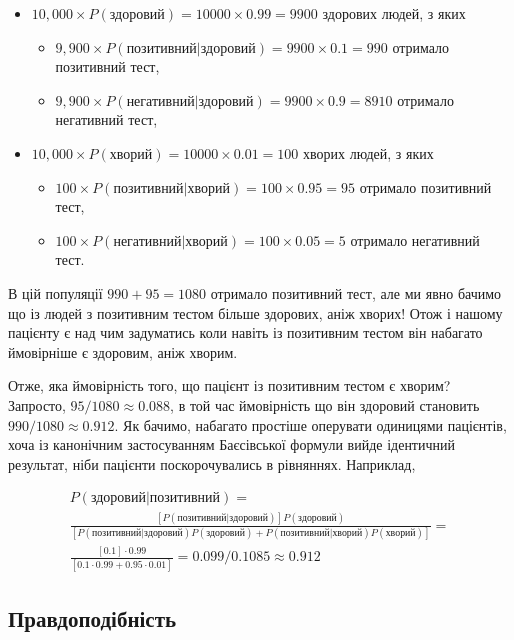 \documentclass[
  11pt,
]{book}
\begin{document}
\begin{itemize}
\item
  \(10,000 \times P(\text{здоровий}) = 10000 \times 0.99 = 9900\) здорових людей, з яких

  \begin{itemize}
  \item
    \(9,900 \times P(\text{позитивний|здоровий}) = 9900 \times 0.1 = 990\) отримало позитивний тест,
  \item
    \(9,900 \times P(\text{негативний|здоровий}) = 9900 \times 0.9 = 8910\) отримало негативний тест,
  \end{itemize}
\item
  \(10,000 \times P(\text{хворий}) = 10000 \times 0.01 = 100\) хворих людей, з яких

  \begin{itemize}
  \item
    \(100 \times P(\text{позитивний|хворий}) = 100 \times 0.95 = 95\) отримало позитивний тест,
  \item
    \(100 \times P(\text{негативний|хворий}) = 100 \times 0.05 = 5\) отримало негативний тест.
  \end{itemize}
\end{itemize}

В цій популяції \(990 + 95 = 1080\) отримало позитивний тест, але ми явно бачимо що із людей з позитивним тестом більше здорових, аніж хворих! Отож і нашому пацієнту є над чим задуматись коли навіть із позитивним тестом він набагато ймовірніше є здоровим, аніж хворим.

Отже, яка ймовірність того, що пацієнт із позитивним тестом є хворим? Запросто, \(95/1080 \approx 0.088\), в той час ймовірність що він здоровий становить \(990/1080 \approx 0.912\). Як бачимо, набагато простіше оперувати одиницями пацієнтів, хоча із канонічним застосуванням Баєсівської формули вийде ідентичний результат, ніби пацієнти поскорочувались в рівняннях. Наприклад,

\[
\begin{aligned}
  P(\text{здоровий|позитивний}) = \\ 
  \frac{[P(позитивний|здоровий)] P(здоровий)}{[P(позитивний|здоровий) P(здоровий) + P(позитивний|хворий) P(хворий)]} = \\
  \frac{[0.1] \cdot 0.99}{[0.1 \cdot 0.99 + 0.95 \cdot 0.01]} = 0.099/0.1085 \approx 0.912
\end{aligned}
\]

\subsection{Правдоподібність}\label{mle}
\end{document}
